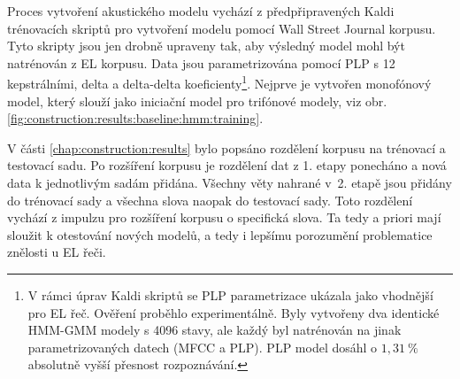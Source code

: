 
Proces vytvoření akustického modelu vychází z předpřipravených Kaldi trénovacích skriptů pro vytvoření modelu pomocí Wall Street Journal korpusu.
Tyto skripty jsou jen drobně upraveny tak, aby výsledný model mohl být natrénován z EL korpusu. Data jsou parametrizována pomocí PLP s 12 kepstrálními, delta a delta-delta koeficienty\footnote{V rámci úprav Kaldi skriptů se PLP parametrizace ukázala jako vhodnější pro EL řeč. Ověření proběhlo experimentálně. Byly vytvořeny dva identické HMM-GMM modely s 4096 stavy, ale každý byl natrénován na jinak parametrizovaných datech (MFCC a PLP). PLP model dosáhl o $1,31\ \%$ absolutně vyšší přesnost rozpoznávání.}. Nejprve je vytvořen monofónový model, který slouží jako iniciační model pro trifónové  modely, viz obr. \ref{fig:construction:results:baseline:hmm:training}.


V části \ref{chap:construction:results} bylo popsáno rozdělení korpusu na trénovací a testovací sadu.
Po rozšíření korpusu je rozdělení dat z 1. etapy ponecháno a nová data k jednotlivým sadám přidána.
Všechny věty nahrané v~2. etapě jsou přidány do trénovací sady a všechna slova naopak do testovací sady.
Toto rozdělení vychází z impulzu pro rozšíření korpusu o specifická slova.
Ta tedy a priori mají sloužit k otestování nových modelů, a tedy i lepšímu porozumění problematice znělosti u EL řeči.


